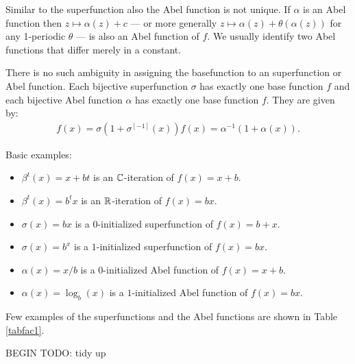\documentclass{article}
\numberwithin{equation}{section}
\begin{document}
Similar to the superfunction also the Abel function is not
unique. If $\alpha$ is an Abel function then $z\mapsto \alpha(z)+c$
--- or more generally $z\mapsto \alpha(z)+\theta(\alpha(z))$ for any 1-periodic
$\theta$ --- is also an Abel function of $f$. We usually identify two
Abel functions that differ merely in a constant.

There is no such ambiguity in assigning the basefunction to an
superfunction or Abel function. Each bijective superfunction $\sigma$
has exactly one base function $f$ and each bijective Abel function
$\alpha$ has exactly one base function $f$. They are given by:
\begin{align*}
  f(x)=\sigma(1+\sigma^{[-1]}(x))
  f(x)=\alpha^{-1}(1+\alpha(x)).
\end{align*}

Basic examples:
\begin{itemize}
\item $\beta^t(x)=x+bt$ is an $\mathbb{C}$-iteration of $f(x)=x+b$.
\item $\beta^t(x)=b^tx$ is an $\mathbb{R}$-iteration of $f(x)=bx$.
\item $\sigma(x)=bx$ is a $0$-initialized superfunction of $f(x)=b+x$. 
\item $\sigma(x)=b^x$ is a $1$-initialized superfunction of $f(x)=bx$.
\item $\alpha(x)=x/b$ is a $0$-initialized Abel function of $f(x)=x+b$.
\item $\alpha(x)=\log_b(x)$ is a $1$-initialized Abel function of
  $f(x)=bx$. \label{example:log}
\end{itemize}
 

Few examples of the superfunctions and the Abel functions are shown in Table \ref{tabfac1}.



BEGIN TODO: tidy up
\end{document}
